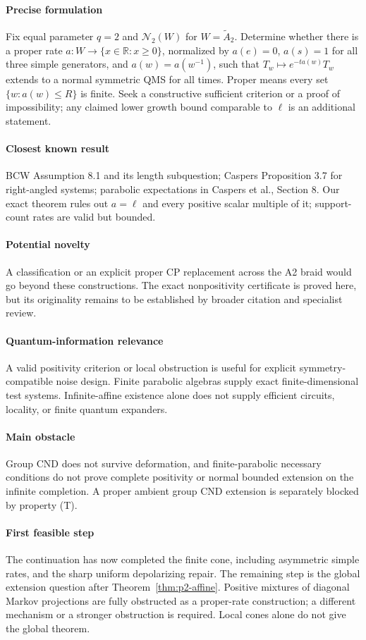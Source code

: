 \documentclass[11pt]{article}
\theoremstyle{remark}\newtheorem{remark}[definition]{Remark}
\newcommand{\R}{\mathbb{R}}
\begin{document}
\paragraph{Precise formulation} Fix equal parameter $q=2$ and
$\mathcal N_2(W)$ for $W=\widetilde A_2$. Determine whether there is a
proper rate $a:W\to\{x\in\R:x\geq0\}$, normalized by $a(e)=0$, $a(s)=1$ for
all three simple generators, and $a(w)=a(w^{-1})$, such that
$T_w\mapsto e^{-ta(w)}T_w$ extends to a normal symmetric QMS for all
times. Proper means every set $\{w:a(w)\leq R\}$ is finite. Seek a
constructive sufficient criterion or a proof of impossibility; any claimed
lower growth bound comparable to $\ell$ is an additional statement.
\paragraph{Closest known result} BCW Assumption 8.1 and its length
subquestion; Caspers Proposition 3.7 for right-angled systems;
parabolic expectations in Caspers et al., Section 8. Our exact theorem
rules out $a=\ell$ and every positive scalar multiple of it; support-count
rates are valid but bounded.
\paragraph{Potential novelty} A classification or an explicit proper
CP replacement across the A2 braid would go beyond these constructions.
The exact nonpositivity certificate is proved here, but its originality
remains to be established by broader citation and specialist review.
\paragraph{Quantum-information relevance} A valid positivity criterion
or local obstruction is useful for explicit symmetry-compatible noise
design. Finite parabolic algebras supply exact finite-dimensional test
systems. Infinite-affine existence alone does not supply efficient circuits,
locality, or finite quantum expanders.
\paragraph{Main obstacle} Group CND does not survive deformation, and
finite-parabolic necessary conditions do not prove complete positivity
or normal bounded extension on the infinite completion. A proper ambient
group CND extension is separately blocked by property (T).
\paragraph{First feasible step} The continuation has now completed the
finite cone, including asymmetric simple rates, and the sharp uniform
depolarizing repair. The remaining step is the global extension question
after Theorem~\ref{thm:p2-affine}. Positive mixtures of diagonal Markov
projections are fully obstructed as a proper-rate construction; a different
mechanism or a stronger obstruction is required. Local cones alone do not
give the global theorem.
\end{document}
